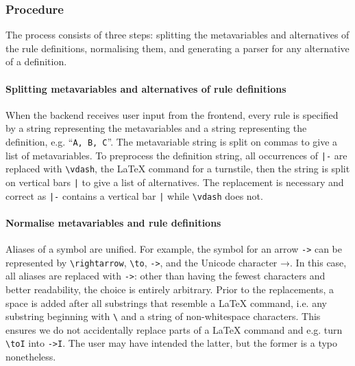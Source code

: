 \subsubsection{Procedure}
The process consists of three steps: splitting the metavariables and alternatives of the rule definitions, normalising them, and generating a parser for any alternative of a definition.

\paragraph{Splitting metavariables and alternatives of rule definitions}
When the backend receives user input from the frontend, every rule is specified by a string representing the metavariables and a string representing the definition, e.g. ``\lstinline{A, B, C}''. The metavariable string is split on commas to give a list of metavariables. To preprocess the definition string, all occurrences of \lstinline{|-} are replaced with \lstinline{\vdash}, the \LaTeX{} command for a turnstile, then the string is split on vertical bars \lstinline{|} to give a list of alternatives. The replacement is necessary and correct as \lstinline{|-} contains a vertical bar \lstinline{|} while \lstinline{\vdash} does not.

\paragraph{Normalise metavariables and rule definitions}
\label{syntax:normalise}
Aliases of a symbol are unified. For example, the symbol for an arrow \lstinline{->} can be represented by \lstinline{\rightarrow}, \lstinline{\to}, \lstinline{->}, and the Unicode character →. In this case, all aliases are replaced with \lstinline{->}: other than having the fewest characters and better readability, the choice is entirely arbitrary. Prior to the replacements, a space is added after all substrings that resemble a \LaTeX{} command, i.e. any substring beginning with \lstinline{\} and a string of non-whitespace characters. This ensures we do not accidentally replace parts of a \LaTeX{} command and e.g. turn \lstinline{\toI} into \lstinline{->I}. The user may have intended the latter, but the former is a typo nonetheless.

